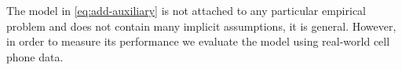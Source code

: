 



The model in \eqref{eq:add-auxiliary} is not attached to any particular empirical problem and does not contain many implicit assumptions, it is general. However, in order to measure its performance we evaluate the model using real-world cell phone data.



